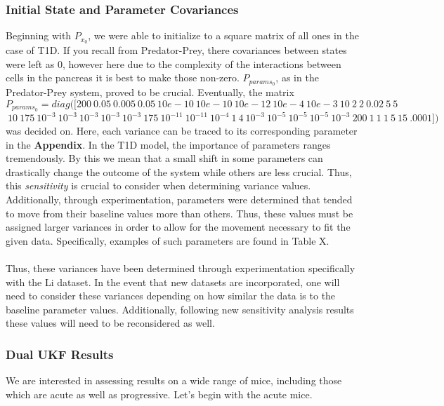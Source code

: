\subsubsection{Initial State and Parameter Covariances}
Beginning with $P_{x_0}$, we were able to initialize to a square matrix of all ones in the case of T1D. If you recall from Predator-Prey, there covariances between states were left as 0, however here due to the complexity of the interactions between cells in the pancreas it is best to make those non-zero. $P_{params_0}$, as in the Predator-Prey system, proved to be crucial. Eventually, the matrix
$$ P_{params_0} = diag([200 \ 0.05 \ 0.005 \ 0.05 \ 10e-10 \ 10e-10 \ 10e-12 \ 10e-4 \ 10e-3 \ 10 \ 2 \ 2 \ 0.02 \ 5 \ 5$$ 
$$\ 10 \ 175 \ 10^{-3} \ 10^{-3} \ 10^{-3} \ 10^{-3} \ 10^{-3} \ 175 \ 10^{-11} \ 10^{-11} \ 10^{-4} \ 1 \ 4 \ 10^{-3} \ 10^{-5} \ 10^{-5} \ 10^{-5} \ 10^{-3} \ 200 \ 1 \ 1 \ 1 \ 5 \ 15 \ .0001]) $$ %
was decided on. Here, each variance can be traced to its corresponding parameter in the \textbf{Appendix}. In the T1D model, the importance of parameters ranges tremendously. By this we mean that a small shift in some parameters can drastically change the outcome of the system while others are less crucial. Thus, this \emph{sensitivity} is crucial to consider when determining variance values. Additionally, through experimentation, parameters were determined that tended to move from their baseline values more than others. Thus, these values must be assigned larger variances in order to allow for the movement necessary to fit the given data. Specifically, examples of such parameters are found in Table X.\\
\\
Thus, these variances have been determined through experimentation specifically with the Li dataset. In the event that new datasets are incorporated, one will need to consider these variances depending on how similar the data is to the baseline parameter values. Additionally, following new sensitivity analysis results these values will need to be reconsidered as well. 


\subsubsection{Dual UKF Results}
We are interested in assessing results on a wide range of mice, including those which are acute as well as progressive. Let's begin with the acute mice.

